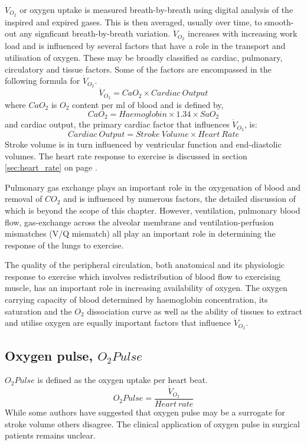 $\dot{V}_{O_2}$ or oxygen uptake is measured breath-by-breath using digital analysis of the inspired and expired gases. 
This is then averaged, usually over time, to smooth-out any signficant breath-by-breath variation. $\dot{V}_{O_2}$ increases with increasing work load and is influenced by several factors that have a role in the transport and utilisation of oxygen. 
These may be broadly classified as cardiac, pulmonary, circulatory and tissue factors. 
Some of the factors are encompassed in the following formula for $\dot{V}_{O_2}$.
\begin{equation} \label{eq:oxygen_consumption}
	\dot{V}_{O_2} = CaO_2 \times Cardiac\ Output
\end{equation}
where $CaO_2$ is $O_2$ content per ml of blood and is defined by,
\begin{equation} \label{eq:CaO2}
	CaO_2 = Haemoglobin \times 1.34 \times SaO_2
\end{equation}
and
cardiac output, the primary cardiac factor that influences $\dot{V}_{O_2}$, is:
\begin{equation} \label{eq:CO=SVxHR}
	Cardiac\ Output = Stroke\ Volume \times Heart\ Rate
\end{equation}
Stroke volume is in turn influenced by ventricular function and end-diastolic volumes. 
The heart rate response to exercise is discussed in section \ref{sec:heart_rate} on page \pageref{sec:heart_rate}.

Pulmonary gas exchange plays an important role in the oxygenation of blood and removal of $CO_2$ and is influenced by numerous factors, the detailed discussion of which is beyond the scope of this chapter. 
However, ventilation, pulmonary blood flow, gas-exchange across the alveolar membrane and ventilation-perfusion mismatches (V/Q mismatch) all play an important role in determining the response of the lungs to exercise.

The quality of the peripheral circulation, both anatomical and its physiologic response to exercise which involves redistribution of blood flow to exercising muscle, has an important role in increasing availability of oxygen. 
The oxygen carrying capacity of blood determined by haemoglobin concentration, its saturation and the $O_2$ dissociation curve as well as the ability of tissues to extract and utilise oxygen are equally important factors that influence $\dot{V}_{O_2}$.

\subsection[Oxygen pulse]{Oxygen pulse, $O_2Pulse$}
$O_2Pulse$ is defined as the oxygen uptake per heart beat.
\begin{equation} \label{eq:oxygen_pulse}
	O_2Pulse = \frac{\dot{V}_{O_2}}{Heart\ rate}
\end{equation}
While some authors have suggested that oxygen pulse may be a surrogate for stroke volume others disagree. 
The clinical application of oxygen pulse in surgical patients remains unclear.

